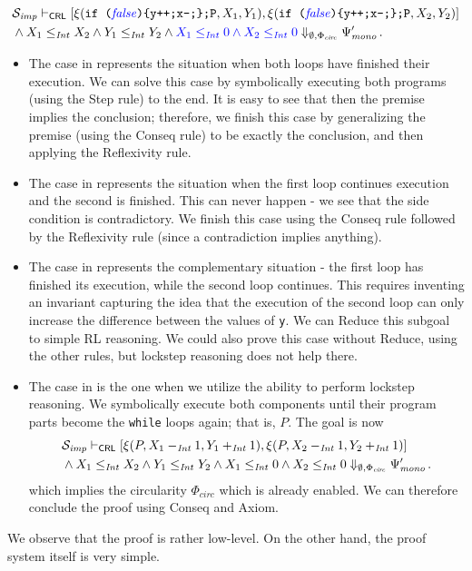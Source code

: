 \begin{equation}\label{ex:case4}
\begin{aligned}
  & \mathcal{S}_{\mathit{imp}} \vdash_{\mathsf{CRL}}
  [ \xi(\texttt{if (}{\color{blue}\mathit{false}}\texttt{)\{y++;x--;\};P}, X_1, Y_1) ,  
    \xi(\texttt{if (}{\color{blue}\mathit{false}}\texttt{)\{y++;x--;\};P}, X_2, Y_2) ] \\
  & \land X_1 \leq_{\mathit{Int}} X_2 \land Y_1 \leq_{\mathit{Int}} Y_2 \land {\color{blue} X_1 \leq_{\mathit{Int}} 0 \land X_2 \leq_{\mathit{Int}} 0 }
  \Downarrow_{\emptyset, \Phi_{\mathit{circ}}} \Psi^\prime_{\mathit{mono}} \, .
\end{aligned}
\end{equation}
\begin{itemize}
\item The case in  represents the situation when both loops have finished their execution.
We can solve this case by symbolically executing both programs (using the Step rule) to the end.
It is easy to see that then the premise implies the conclusion; therefore, we finish this case
by generalizing the premise (using the Conseq rule) to be exactly the conclusion, and then applying
the Reflexivity rule.
\item The case in  represents the situation when the first loop continues execution and the second is finished.
      This can never happen - we see that the side condition is contradictory.
      We finish this case using the Conseq rule followed by the Reflexivity rule (since a contradiction implies anything).
\item The case in  represents the complementary situation - the first loop has finished its execution,
      while the second loop continues.
      This requires inventing an invariant capturing the idea that the execution of the second loop can only increase
      the difference between the values of \texttt{y}.
      We can Reduce this subgoal to simple RL reasoning. We could also prove this case without Reduce,
      using the other rules, but lockstep reasoning does not help there.
\item The case in  is the one when we utilize the ability to perform lockstep reasoning.
      We symbolically execute both components until their program parts become the \texttt{while} loops again;
      that is, $P$.
      The goal is now
      \begin{align*}
        & \mathcal{S}_{\mathit{imp}} \vdash_{\mathsf{CRL}}
        [ \xi(P, X_1 -_{\mathit{Int}} 1, Y_1 +_{\mathit{Int}} 1 ) ,  
          \xi(P, X_2 -_{\mathit{Int}} 1, Y_2 +_{\mathit{Int}} 1) ] \\
        & \land X_1 \leq_{\mathit{Int}} X_2 \land Y_1 \leq_{\mathit{Int}} Y_2 \land {X_1 \leq_{\mathit{Int}} 0 \land X_2 \leq_{\mathit{Int}} 0 }
        \Downarrow_{\emptyset, \Phi_{\mathit{circ}}} \Psi^\prime_{\mathit{mono}} \, .
      \end{align*}
      which implies the circularity $\Phi_{\mathit{circ}}$ which is already enabled.
      We can therefore conclude the proof using Conseq and Axiom.
\end{itemize}
We observe that the proof is rather low-level.
On the other hand, the proof system itself is very simple.

